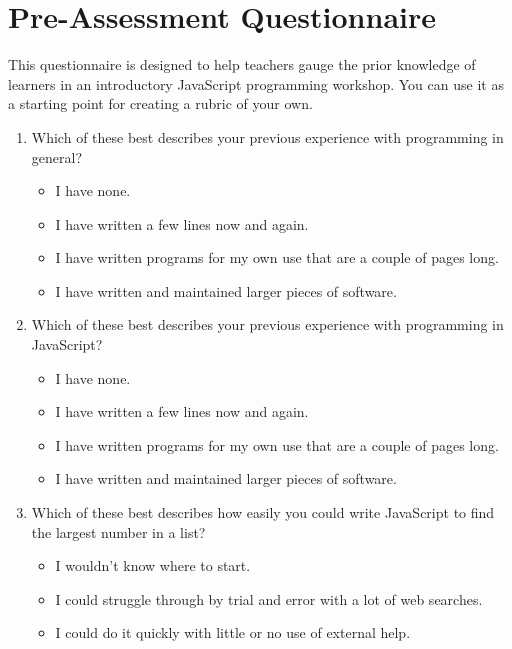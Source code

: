 \chapter{Pre-Assessment Questionnaire}\label{s:preassess}

This questionnaire is designed to help teachers gauge the prior
knowledge of learners in an introductory JavaScript programming
workshop.  You can use it as a starting point for creating a rubric of
your own.

\begin{enumerate}

\item
  Which of these best describes your previous experience with
  programming in general?
  \begin{itemize}
  \item
    I have none.
  \item
    I have written a few lines now and again.
  \item
    I have written programs for my own use that are a couple of pages long.
  \item
    I have written and maintained larger pieces of software.
  \end{itemize}

\item
  Which of these best describes your previous experience with
  programming in JavaScript?
  \begin{itemize}
  \item
    I have none.
  \item
    I have written a few lines now and again.
  \item
    I have written programs for my own use that are a couple of pages long.
  \item
    I have written and maintained larger pieces of software.
  \end{itemize}

\item
  Which of these best describes how easily you could write JavaScript
  to find the largest number in a list?
  \begin{itemize}
  \item
    I wouldn't know where to start.
  \item
    I could struggle through by trial and error with a lot of web searches.
  \item
    I could do it quickly with little or no use of external help.
  \end{itemize}


\end{enumerate}
